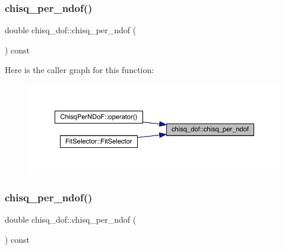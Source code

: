 \subsubsection{\texorpdfstring{chisq\_per\_ndof()}{chisq\_per\_ndof()}\hspace{0.1cm}{\footnotesize\ttfamily [1/2]}}
{\footnotesize\ttfamily double chisq\+\_\+dof\+::chisq\+\_\+per\+\_\+ndof (\begin{DoxyParamCaption}{ }\end{DoxyParamCaption}) const\hspace{0.3cm}{\ttfamily [inline]}}

Here is the caller graph for this function\+:
\nopagebreak
\begin{figure}[H]
\begin{center}
\leavevmode
\includegraphics[width=350pt]{d0/dcc/structchisq__dof_a07ed162cd41ce4a036f5e527c52ab66d_icgraph}
\end{center}
\end{figure}
\mbox{\label{structchisq__dof_a07ed162cd41ce4a036f5e527c52ab66d}} 
\subsubsection{\texorpdfstring{chisq\_per\_ndof()}{chisq\_per\_ndof()}\hspace{0.1cm}{\footnotesize\ttfamily [2/2]}}
{\footnotesize\ttfamily double chisq\+\_\+dof\+::chisq\+\_\+per\+\_\+ndof (\begin{DoxyParamCaption}{ }\end{DoxyParamCaption}) const\hspace{0.3cm}{\ttfamily [inline]}}

\mbox{\label{structchisq__dof_a14e009144be8062101c59798a6239f5b}} 
